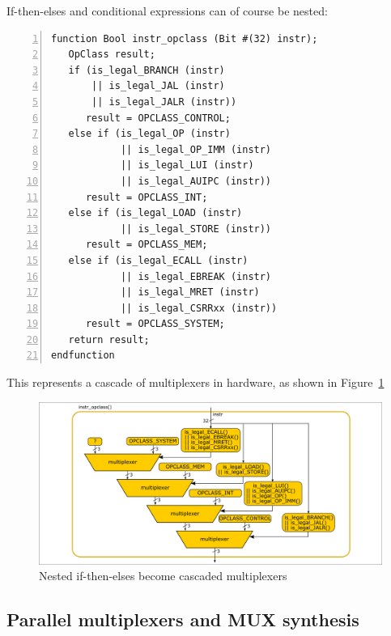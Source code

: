 If-then-elses and conditional expressions can of course be nested:


{\small
\begin{Verbatim}[frame=single, numbers=left]
function Bool instr_opclass (Bit #(32) instr);
   OpClass result;
   if (is_legal_BRANCH (instr)
       || is_legal_JAL (instr)
       || is_legal_JALR (instr))
      result = OPCLASS_CONTROL;
   else if (is_legal_OP (instr)
            || is_legal_OP_IMM (instr)
            || is_legal_LUI (instr)
            || is_legal_AUIPC (instr))
      result = OPCLASS_INT;
   else if (is_legal_LOAD (instr)
            || is_legal_STORE (instr))
      result = OPCLASS_MEM;
   else if (is_legal_ECALL (instr)
            || is_legal_EBREAK (instr)
            || is_legal_MRET (instr)
            || is_legal_CSRRxx (instr))
      result = OPCLASS_SYSTEM;
   return result;
endfunction
\end{Verbatim}
}

This represents a cascade of multiplexers in hardware, as shown in
Figure~\ref{Fig_Combo_Multiplexer_Cascade}
\begin{figure}[htbp]
  \centerline{\includegraphics[width=6in,angle=0]{Figures/Fig_Combo_Multiplexer_Cascade}}
  \caption{\label{Fig_Combo_Multiplexer_Cascade}Nested if-then-elses become cascaded multiplexers}
\end{figure}


\subsection{Parallel multiplexers and MUX synthesis}

\label{Sec_MUXes}


